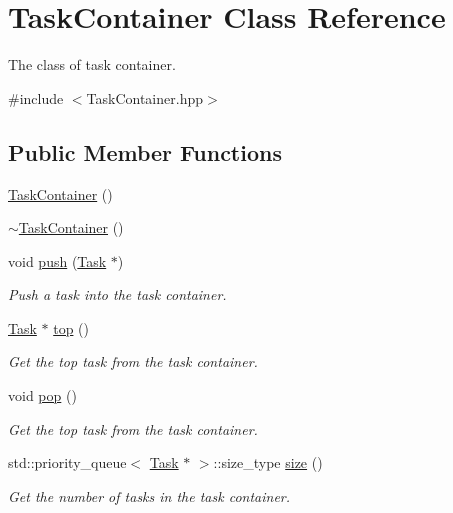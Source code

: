 \hypertarget{classTaskContainer}{}\section{Task\+Container Class Reference}
\label{classTaskContainer}


The class of task container.  




{\ttfamily \#include $<$Task\+Container.\+hpp$>$}

\subsection*{Public Member Functions}
\begin{DoxyCompactItemize}
\item 
\hyperlink{classTaskContainer_a7e3135258232a3fad842ce5006fe30b0}{Task\+Container} ()
\item 
\hyperlink{classTaskContainer_a8d7a3ea804743f8d263399134e82a27b}{$\sim$\+Task\+Container} ()
\item 
void \hyperlink{classTaskContainer_afa83fd5f9b758c356cdb7838f953ec1d}{push} (\hyperlink{classTask}{Task} $\ast$)
\begin{DoxyCompactList}\small\item\em Push a task into the task container. \end{DoxyCompactList}\item 
\hyperlink{classTask}{Task} $\ast$ \hyperlink{classTaskContainer_a32bb364b0b32e907fceeb9a2fb49d2f3}{top} ()
\begin{DoxyCompactList}\small\item\em Get the top task from the task container. \end{DoxyCompactList}\item 
void \hyperlink{classTaskContainer_ae50a94fbdf60d08bf66e586ba5b94ad0}{pop} ()
\begin{DoxyCompactList}\small\item\em Get the top task from the task container. \end{DoxyCompactList}\item 
std\+::priority\+\_\+queue$<$ \hyperlink{classTask}{Task} $\ast$ $>$\+::size\+\_\+type \hyperlink{classTaskContainer_ad195d3caf63e1deea6244973b603ce63}{size} ()
\begin{DoxyCompactList}\small\item\em Get the number of tasks in the task container. \end{DoxyCompactList}\end{DoxyCompactItemize}
